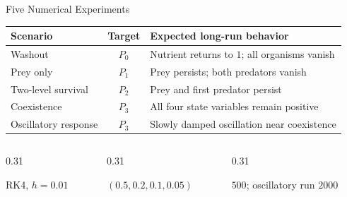 
\begin{frame}{Five Numerical Experiments}
  \renewcommand{\arraystretch}{1.15}
  \begin{tabular}{p{}cp{}}
    \toprule
    Scenario & Target & Expected long-run behavior \\
    \midrule
    Washout & $P_0$ & Nutrient returns to $1$; all organisms vanish \\
    Prey only & $P_1$ & Prey persists; both predators vanish \\
    Two-level survival & $P_2$ & Prey and first predator persist \\
    Coexistence & $P_3$ & All four state variables remain positive \\
    Oscillatory response & $P_3$ & Slowly damped oscillation near coexistence \\
    \bottomrule
  \end{tabular}

  \vspace{0.38cm}
  \begin{columns}[T,onlytextwidth]
    \begin{column}{0.31\textwidth}
      \par RK4, $h=0.01$
    \end{column}
    \begin{column}{0.31\textwidth}
      \par $(0.5,0.2,0.1,0.05)$
    \end{column}
    \begin{column}{0.31\textwidth}
      \par $500$; oscillatory run $2000$
    \end{column}
  \end{columns}
\end{frame}

